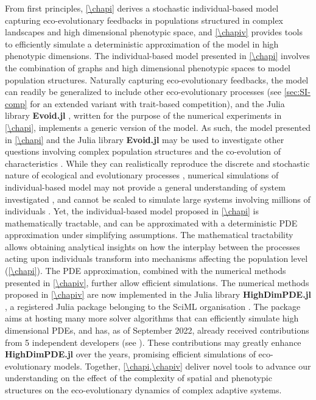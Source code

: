 From first principles, \cref{\chapi} derives a stochastic individual-based model capturing eco-evolutionary feedbacks in populations structured in complex landscapes and high dimensional phenotypic space, and \cref{\chapiv} provides tools to efficiently simulate a deterministic approximation of the model in high phenotypic dimensions.
% 
The individual-based model presented in \cref{\chapi} involves the combination of graphs and high dimensional phenotypic spaces to model population structures. Naturally capturing eco-evolutionary feedbacks, the model can readily be generalized to include other eco-evolutionary processes (see \cref{sec:SI-comp} for an extended variant with trait-based competition), and the Julia library \textbf{Evoid.jl} \cite{Evoid.jl}, written for the purpose of the numerical experiments in \cref{\chapi}, implements a generic version of the model. %
% 
As such, the model presented in \cref{\chapi} and the Julia library \textbf{Evoid.jl} may be used to investigate other questions involving complex population structures \citep{LiebermanHauert2005} and the co-evolution of characteristics \citep{Doebeli2011}.
% 
While they can realistically reproduce the discrete and stochastic nature of ecological and evolutionary processes \citep{Champagnat2006}, numerical simulations of individual-based model may not provide a general understanding of system investigated \citep{Lyon2016,Hodgson2019}, and cannot be scaled to simulate large systems involving millions of individuals \citep{deangelis2005individual}. Yet, the individual-based model proposed in \cref{\chapi} is mathematically tractable, and can be approximated with a deterministic PDE approximation under simplifying assumptions.
% 
The mathematical tractability allows obtaining analytical insights on how the interplay between the processes acting upon individuals transform into mechanisms affecting the population level (\cref{\chapi}).
% 
The PDE approximation, combined with the numerical methods presented in \cref{\chapiv}, further allow efficient simulations. 
% 
The numerical methods proposed in \cref{\chapiv} are now implemented in the Julia library \textbf{HighDimPDE.jl} \citep{HighDimPDE}, a registered Julia package belonging to the SciML organisation \citep{SciML}.
%
The package aims at hosting many more solver algorithms that can efficiently simulate high dimensional PDEs, and has, as of September 2022, already received contributions from 5 independent developers (see \cite{https://github.com/SciML/HighDimPDE.jl/graphs/contributors}). These contributions may greatly enhance \textbf{HighDimPDE.jl} over the years, promising efficient simulations of eco-evolutionary models.
% 
% 
Together, \cref{\chapi,\chapiv} deliver novel tools to advance our understanding on the effect of the complexity of spatial and phenotypic structures on the eco-evolutionary dynamics of complex adaptive systems.


